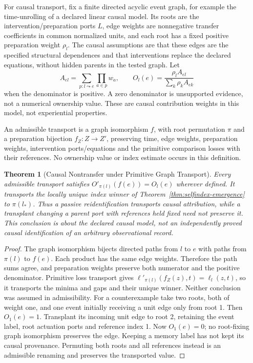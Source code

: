 \documentclass[11pt,a4paper]{article}
\newtheorem{theorem}{Theorem}[section]
\theoremstyle{definition}
\begin{document}
For causal transport, fix a finite directed acyclic event graph, for example
the time-unrolling of a declared linear causal model. Its roots are the
intervention/preparation ports $L$, edge weights are nonnegative transfer
coefficients in common normalized units, and each root has a fixed positive
preparation weight $\rho_l$. The causal assumptions are that these edges
are the specified structural dependences and that interventions replace the
declared equations, without hidden parents in the tested graph. Let
\[
 A_{el}=\sum_{p:l\leadsto e}\prod_{a\in p}w_a,\qquad
 O_l(e)=\frac{\rho_l A_{el}}{\sum_k\rho_k A_{ek}}
\]
when the denominator is positive. A zero denominator is unsupported evidence,
not a numerical ownership value. These are causal contribution weights in
this model, not experiential properties.

An admissible transport is a graph isomorphism $f$, with root permutation
$\pi$ and a preparation bijection $f_Z:Z\to Z'$, preserving time, edge weights, preparation weights, intervention
ports/equations and the primitive comparison losses with their references.
No ownership value or index estimate occurs in this definition.

\begin{theorem}[Causal Nontransfer under Primitive Graph Transport]
\label{thm:ownership-nontransfer}
Every admissible transport satisfies
$O'_{\pi(l)}(f(e))=O_l(e)$ wherever defined. It transports the locally
unique index winner of Theorem~\ref{thm:selfindex-emergence} to $\pi(l_*)$.
Thus a passive reidentification transports causal attribution, while a
transplant changing a parent port with references held fixed need not preserve
it. This conclusion is about the declared causal model, not an independently
proved causal identification of an arbitrary observational record.
\end{theorem}
\begin{proof}
The graph isomorphism bijects directed paths from $l$ to $e$ with paths from
$\pi(l)$ to $f(e)$. Each product has the same edge weights. Therefore the
path sums agree, and preparation weights preserve both numerator and the
positive denominator. Primitive loss transport gives
$\ell'_{\pi(l)}(f_Z(z),t)=\ell_l(z,t)$, so it transports the minima and gaps
and their unique winner. Neither conclusion was assumed in admissibility.
For a counterexample take two roots, both of weight one, and one event
initially receiving a unit edge only from root 1. Then $O_1(e)=1$.
Transplant its incoming unit edge to root 2, retaining the event label,
root actuation ports and reference index 1. Now $O_1(e)=0$; no root-fixing
graph isomorphism preserves the edge. Keeping a memory label has not kept
its causal provenance. Permuting both roots and all references instead is
an admissible renaming and preserves the transported value.
\end{proof}
\end{document}
